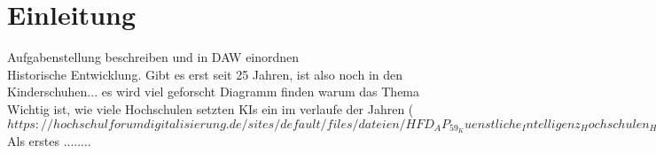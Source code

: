 \chapter{Einleitung}
Aufgabenstellung beschreiben und in DAW einordnen
\\
\noindent
Historische Entwicklung. Gibt es erst seit 25 Jahren, ist also noch in den Kinderschuhen... es wird viel geforscht
Diagramm finden warum das Thema Wichtig ist, wie viele Hochschulen setzten KIs ein im verlaufe der Jahren ($https://hochschulforumdigitalisierung.de/sites/default/files/dateien/HFD_AP_59_Kuenstliche_Intelligenz_Hochschulen_HIS-HE.pdf Seite 9)$
\\
\noindent
Als erstes ........